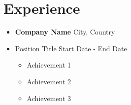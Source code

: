 \section*{Experience}
\begin{itemize}
    \item[] \textbf{Company Name} \hfill City, Country
    \item[] Position Title \hfill Start Date - End Date
    \begin{itemize}
        \item Achievement 1
        \item Achievement 2
        \item Achievement 3
    \end{itemize}
\end{itemize}
\sectionspace 